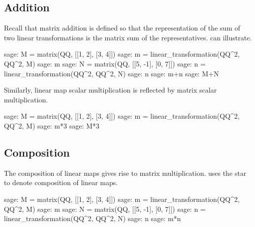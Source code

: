 \subsection{Addition}
Recall that matrix addition is defined so that the representation of
the sum of two linear transformations is the matrix sum of the representatives.
\Sage{} can illustrate.
\begin{sagecommandline}
sage: M = matrix(QQ, [[1, 2], [3, 4]])
sage: m = linear_transformation(QQ^2, QQ^2, M)
sage: m
sage: N = matrix(QQ, [[5, -1], [0, 7]])
sage: n = linear_transformation(QQ^2, QQ^2, N)
sage: n
sage: m+n
sage: M+N
\end{sagecommandline}
\noindent Similarly, linear map scalar multiplication is reflected by 
matrix scalar multiplication.
\begin{sagecommandline}
sage: M = matrix(QQ, [[1, 2], [3, 4]])
sage: m = linear_transformation(QQ^2, QQ^2, M)
sage: m*3
sage: M*3  
\end{sagecommandline}



\subsection{Composition}
The composition of linear maps gives rise to matrix multiplication.
\Sage{} uses the star \inlinecode{*} to denote composition of linear maps.
\begin{sagecommandline}
sage: M = matrix(QQ, [[1, 2], [3, 4]])
sage: m = linear_transformation(QQ^2, QQ^2, M)
sage: m
sage: N = matrix(QQ, [[5, -1], [0, 7]])
sage: n = linear_transformation(QQ^2, QQ^2, N)
sage: n
sage: m*n
\end{sagecommandline}


